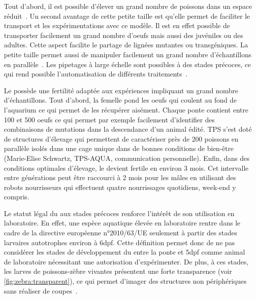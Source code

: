 \documentclass[\main/main.tex]{subfiles}
\begin{document}
%
Tout d'abord, il est possible d'élever un grand nombre de poissons dans un espace réduit~\cite{avdesh_2012}.
%
Un second avantage de cette petite taille est qu'elle permet de faciliter le transport et les expérimentations avec ce modèle.
%
Il est en effet possible de transporter facilement un grand nombre d'oeufs mais aussi des juvéniles ou des adultes.
%
Cette aspect facilite le partage de lignées mutantes ou transgéniques.
%
%
La petite taille permet aussi de manipuler facilement un grand nombre d'échantillons en parallèle~\cite{wittbrodt_2014,brion_2012}. Les pipetages à large échelle sont possibles à des stades précoces,
ce qui rend possible l'automatisation de différents traitements~\cite{mandrell_2012,teixid_2019}.

Le \pz{} possède une fertilité adaptée aux expériences impliquant un grand nombre d'échantillons.
%
Tout d'abord, la femelle pond les oeufs qui coulent au fond de l'aquarium ce  qui permet de les récupérer aisément. Chaque ponte contient entre 100 et 500 oeufs ce qui permet par exemple facilement d'identifier des combinaisons de mutations dans la descendance d'un animal édité. TPS s'est doté de structures d'élevage qui permettent de caractériser près de 200 poissons en parallèle isolés dans une cage unique dans de bonnes conditions de bien-être (Marie-Elise Schwartz, TPS-AQUA, communication personnelle).  
%
Enfin, dans des conditions optimales d'élevage, le \pz{} devient fertile en environ 3 mois. Cet intervalle entre générations peut être raccourci à 2 mois pour les mâles en utilisant des robots nourrisseurs qui effectuent quatre nourrissages quotidiens, week-end y compris. 


Le statut légal du \pz{} aux stades précoces renforce l'intérêt de son utilisation en laboratoire.
%
En effet, une espèce aquatique élevée en laboratoire rentre dans le cadre de la directive européenne n°2010/63/UE seulement à partir des stades larvaires autotrophes environ à 6dpf.
%
Cette définition permet donc de ne pas considérer les stades de développement du \pz{} entre la ponte et 5dpf comme animal de laboratoire nécessitant une autorisation d'expérimenter.
%
%
De plus, à ces stades, les larves de poissons-zèbre vivantes présentent une forte transparence (voir \autoref{fig:zebra:transparent}),
ce qui permet d'imager des structures non périphériques sans réaliser de coupes~\cite{asokan_2020,chen_2020,hamilton_2016,kioka_2020}.
\end{document}
